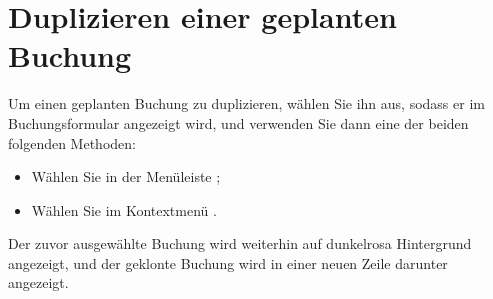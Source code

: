 \section{Duplizieren einer geplanten Buchung\label{plannedtransactions-duplicate}}

Um einen geplanten Buchung zu duplizieren, wählen Sie ihn aus, sodass er im Buchungsformular angezeigt wird, und verwenden Sie dann eine der beiden folgenden Methoden:
\begin{itemize}
	\item Wählen Sie in der Menüleiste ;
	\item Wählen Sie im Kontextmenü .
\end{itemize}

Der zuvor ausgewählte Buchung wird weiterhin auf \colorbox[RGB]{245,155,155}{dunkelrosa Hintergrund} angezeigt, und der geklonte Buchung wird in einer neuen Zeile darunter angezeigt.

